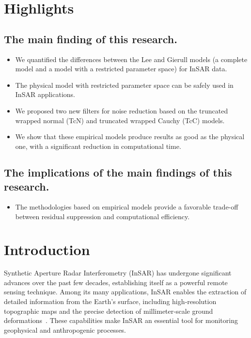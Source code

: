 \documentclass[remotesensing,article,submit,pdftex,moreauthors]{Definitions/mdpi}
\begin{document}
\section*{Highlights}

\subsection*{The main finding of this research.}
\begin{itemize}[label=$\bullet$]
\item We quantified the differences between the Lee and Gierull models (a complete model and a model with a restricted parameter space) for InSAR data.
 
\item The physical model with restricted parameter space can be safely used in InSAR applications.

\item We proposed two new filters for noise reduction based on the truncated wrapped normal (TcN) and truncated wrapped Cauchy (TcC) models.

\item We show that these empirical models produce results as good as the physical one, with a significant reduction in computational time.
\end{itemize}
%
\subsection*{The implications of the main findings of this research.}
\begin{itemize}[label=$\bullet$]
    \item The methodologies based on empirical models provide a favorable trade-off between residual suppression and computational efficiency.
\end{itemize}
%
\section{Introduction}\label{sec:intro}
Synthetic Aperture Radar Interferometry (InSAR) has undergone significant advances over the past few decades, establishing itself as a powerful remote sensing technique. 
Among its many applications, InSAR enables the extraction of detailed information from the Earth’s surface, including high‑resolution topographic maps and the precise detection of millimeter‑scale ground deformations~\cite{InterferometricSyntheticApertureRadarStatisticalInference}. 
These capabilities make InSAR an essential tool for monitoring geophysical and anthropogenic processes.
\end{document}
